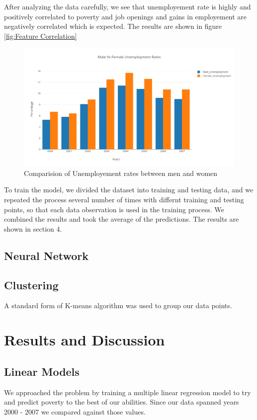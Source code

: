 \documentclass[11pt,letterpaper]{article}
\begin{document}
After analyzing the data carefully, we see that unemployement rate is highly and positively correlated to poverty and job openings and gains in employement are negatively correlated which is expected. The results are shown in figure \ref{fig:Feature Correlation}

\begin{figure}
\centering
\includegraphics[width=\linewidth]{"./pictures/MaleVsFemaleUnemployment"}
\caption{Comparision of Unemployement rates between men and women}
\label{fig:MaleVsFemaleUnemployment}
\end{figure}

To train the model, we divided the dataset into training and testing data, and we repeated the process several number of times with differnt training and testing points, so that each data observation is used in the training process. We combined the results and took the average of the predictions. The results are shown in section 4.

\subsection{Neural Network}
\label{ssec:nn}

\subsection{Clustering}
\label{ssec:cluster}

A standard form of K-means algorithm was used to group our data points. 


\section{Results and Discussion}

\subsection{Linear Models}
\label{ssec:linearResults}
We approached the problem by training a multiple linear regression model to try and predict poverty to the best of our abilities. Since our data spanned years 2000 - 2007 we compared against those values. 
\end{document}

